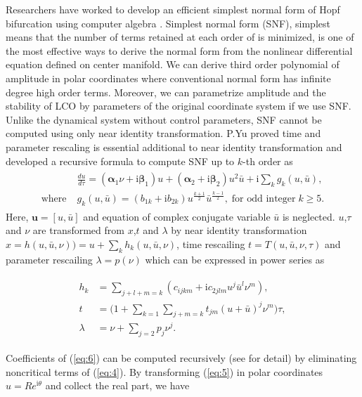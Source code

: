 \documentclass[openacc]{rsproca_new}%
\def\vec#1{\ensuremath{\mathbf{#1}}}
\newcommand{\Eref}[1]{(\ref{#1})}
\begin{document}
Researchers have worked to develop an efficient simplest normal form of Hopf bifurcation using computer algebra \cite{yu1998computation}. Simplest normal form (SNF), simplest means that the number of terms retained at each order of is minimized, is one of the most effective ways to derive the normal form from the nonlinear differential equation defined on center manifold. We can derive third order polynomial of amplitude in polar coordinates where conventional normal form has infinite degree high order terms. Moreover, we can parametrize amplitude and the stability of LCO by parameters of the original coordinate system if we use SNF. Unlike the dynamical system without control parameters, SNF cannot be computed using only near identity transformation. P.Yu \cite{yu2002simplest} proved time and parameter rescaling is essential additional to near identity transformation and developed a recursive formula to compute SNF up to $k$-th order as
\begin{align}\label{eq:5}
  \begin{split}
    &\frac{du}{d\tau}=(\vec{\alpha}_1 \nu+\textrm{i}\vec{\beta}_1) u+(\vec{\alpha}_2+\textrm{i}\vec{\beta}_2) u^2 \bar{u}+\textrm{i}\sum_k g_k(u,\bar{u}),\\
    \textrm{where} \;  &g_k(u,\bar{u})=(b_{1k}+\textrm{i}b_{2k})u^{\frac{k+1}{2}}\bar{u}^{\frac{k-1}{2}}, \; \textrm{for odd integer} \;k \geq 5.
  \end{split}
\end{align}
Here, \(\vec{u}=[u,\bar{u}]\) and equation of complex conjugate variable \(\bar{u}\) is neglected. \(u\),\(\tau\) and \(\nu\) are transformed from \(x\),\(t\) and \(\lambda\) by near identity transformation
\(x=h(u,\bar{u},\nu))=u+\sum_k h_k(u,\bar{u},\nu)\), time rescailing \(t=T(u,\bar{u},\nu,\tau)\) and parameter rescailing \(\lambda=p(\nu)\) which can be expressed in power series as

\begin{align}\label{eq:6}
  \begin{split}
    h_k &=\sum_{j+l+m=k}(c_{ijkm}+\textrm{i}c_{2jlm}u^j\bar{u}^l \nu^m),\\
    t &=\Big(1+\sum_{k=1}\sum_{j+m=k}t_{jm}(u+\bar{u})^j\nu^m\Big)\tau,\\
    \lambda &=\nu+\sum_{j=2}p_j \nu^j.
  \end{split}
\end{align}

\noindent Coefficients of \Eref{eq:6} can be computed recursively (see \cite{yu2002simplest} for detail) by eliminating noncritical terms of \Eref{eq:4}. By transforming \Eref{eq:5} in polar coordinates $u=Re^{\textrm{i}\theta}$ and collect the real part, we have
\end{document}

